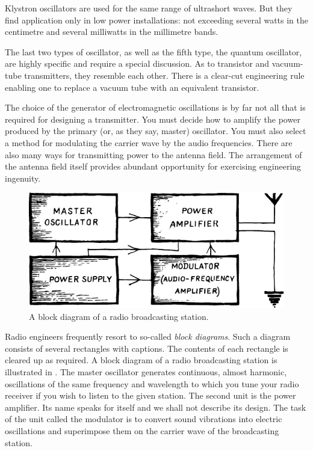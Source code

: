 Klystron oscillators are used for the same range of ultrashort waves. But they find application only in low power installations: not exceeding several watts in the centimetre and several milliwatts in the millimetre bands.

The last two types of oscillator, as well as the fifth type, the quantum oscillator, are highly specific and require a special discussion. As to transistor and vacuum-tube transmitters, they resemble each other. There is a clear-cut engineering rule enabling one to replace a vacuum tube with an equivalent transistor.

The choice of the generator of electromagnetic oscillations is by far not all that is required for designing a transmitter. You must decide how to amplify the power produced by the primary (or, as they say, master) oscillator. You must also select a method for modulating the carrier wave by the audio frequencies. There are also many ways for transmitting power to the antenna field. The arrangement of the antenna field itself provides abundant opportunity for exercising engineering ingenuity.
\begin{figure}[!ht]
\centering
\includegraphics[width=\textwidth]{figures/fig-06-09.pdf}
\caption{A block diagram of a radio broadcasting station.}
\label{fig-6.9}
\end{figure}

Radio engineers frequently resort to so-called \emph{block diagrams}. Such a diagram consists of several rectangles with captions. The contents of each rectangle is cleared up as required. A block diagram of a radio broadcasting station is illustrated in . The master oscillator generates continuous, almost harmonic, oscillations of the same frequency and wavelength to which you tune
your radio receiver if you wish to listen to the given station. The second unit is the power amplifier. Its name speaks for itself and we shall not describe its design. The task of the unit called the modulator is to convert sound vibrations into electric oscillations and superimpose them on the carrier wave of the broadcasting station.

